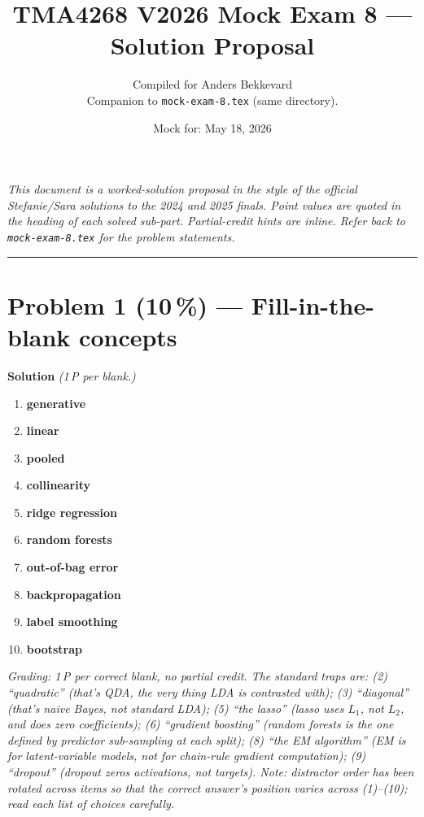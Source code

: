 \documentclass[11pt,a4paper]{article}
\title{TMA4268 V2026 Mock Exam 8 --- Solution Proposal\\[0.3em]
\large}
\author{Compiled for Anders Bekkevard\\[0.2em]
\small Companion to \texttt{mock-exam-8.tex} (same directory).}
\date{Mock for: May 18, 2026}
\newcommand{\points}[1]{\textbf{(#1\,\%)}}
\newcommand{\sol}{\noindent\textbf{Solution}}
\begin{document}
\maketitle

\noindent\textit{This document is a worked-solution proposal in the style of the official
Stefanie/Sara solutions to the 2024 and 2025 finals. Point values are quoted in the heading of each
solved sub-part. Partial-credit hints are inline. Refer back to \texttt{mock-exam-8.tex} for the
problem statements.}

\vspace{0.6em}
\hrule
\vspace{1em}

\section*{Problem 1 \points{10} --- Fill-in-the-blank concepts}

\sol{} \emph{(1\,P per blank.)}

\begin{enumerate}[(1)]
  \item \textbf{generative}
  \item \textbf{linear}
  \item \textbf{pooled}
  \item \textbf{collinearity}
  \item \textbf{ridge regression}
  \item \textbf{random forests}
  \item \textbf{out-of-bag error}
  \item \textbf{backpropagation}
  \item \textbf{label smoothing}
  \item \textbf{bootstrap}
\end{enumerate}

\noindent\emph{Grading: 1\,P per correct blank, no partial credit. The standard traps are:
(2) ``quadratic'' (that's QDA, the very thing LDA is contrasted with);
(3) ``diagonal'' (that's naive Bayes, not standard LDA);
(5) ``the lasso'' (lasso uses $L_1$, not $L_2$, and \emph{does} zero coefficients);
(6) ``gradient boosting'' (random forests is the one defined by predictor sub-sampling at each
split);
(8) ``the EM algorithm'' (EM is for latent-variable models, not for chain-rule gradient
computation);
(9) ``dropout'' (dropout zeros activations, not targets). Note: distractor order has been rotated across
items so that the correct answer's position varies across (1)--(10); read each list of choices carefully.}
\end{document}
